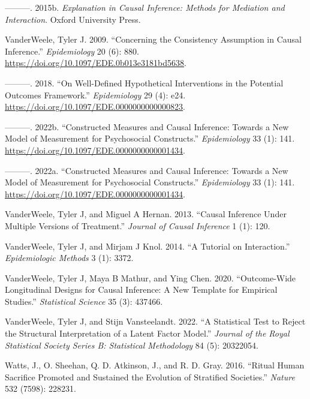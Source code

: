 \documentclass[
  singlecolumn]{report}
\newlength{\cslhangindent}
\newlength{\cslentryspacingunit} %
\newenvironment{CSLReferences}[2] %
 {%
  \setlength{\parindent}{0pt}
  \ifodd #1
  \let\oldpar\par
  \def\par{\hangindent=\cslhangindent\oldpar}
  \fi
  \setlength{\parskip}{#2\cslentryspacingunit}
 }%
 {}
\begin{document}
\begin{CSLReferences}{1}{0}
\leavevmode{}%
---------. 2015b. \emph{Explanation in Causal Inference: Methods for
Mediation and Interaction}. Oxford University Press.

\leavevmode{}%
VanderWeele, Tyler J. 2009. {``Concerning the Consistency Assumption in
Causal Inference.''} \emph{Epidemiology} 20 (6): 880.
\url{https://doi.org/10.1097/EDE.0b013e3181bd5638}.

\leavevmode{}%
---------. 2018. {``On Well-Defined Hypothetical Interventions in the
Potential Outcomes Framework.''} \emph{Epidemiology} 29 (4): e24.
\url{https://doi.org/10.1097/EDE.0000000000000823}.

\leavevmode{}%
---------. 2022b. {``Constructed Measures and Causal Inference: Towards
a New Model of Measurement for Psychosocial Constructs.''}
\emph{Epidemiology} 33 (1): 141.
\url{https://doi.org/10.1097/EDE.0000000000001434}.

\leavevmode{}%
---------. 2022a. {``Constructed Measures and Causal Inference: Towards
a New Model of Measurement for Psychosocial Constructs.''}
\emph{Epidemiology} 33 (1): 141.
\url{https://doi.org/10.1097/EDE.0000000000001434}.

\leavevmode{}%
VanderWeele, Tyler J, and Miguel A Hernan. 2013. {``Causal Inference
Under Multiple Versions of Treatment.''} \emph{Journal of Causal
Inference} 1 (1): 120.

\leavevmode{}%
VanderWeele, Tyler J, and Mirjam J Knol. 2014. {``A Tutorial on
Interaction.''} \emph{Epidemiologic Methods} 3 (1): 3372.

\leavevmode{}%
VanderWeele, Tyler J, Maya B Mathur, and Ying Chen. 2020.
{``Outcome-Wide Longitudinal Designs for Causal Inference: A New
Template for Empirical Studies.''} \emph{Statistical Science} 35 (3):
437466.

\leavevmode{}%
VanderWeele, Tyler J, and Stijn Vansteelandt. 2022. {``A Statistical
Test to Reject the Structural Interpretation of a Latent Factor
Model.''} \emph{Journal of the Royal Statistical Society Series B:
Statistical Methodology} 84 (5): 20322054.

\leavevmode{}%
Watts, J., O. Sheehan, Q. D. Atkinson, J., and R. D. Gray. 2016.
{``Ritual Human Sacrifice Promoted and Sustained the Evolution of
Stratified Societies.''} \emph{Nature} 532 (7598): 228231.


\end{CSLReferences}
\end{document}

